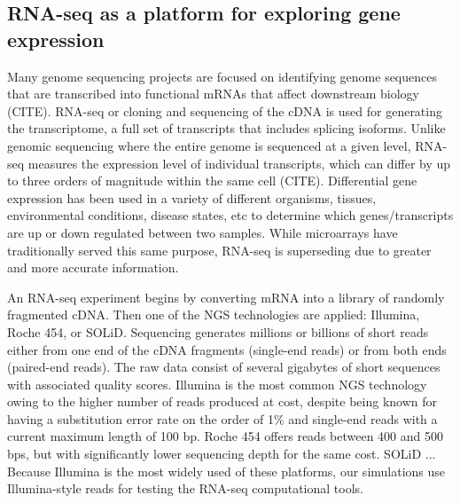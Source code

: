 \documentclass[10pt]{article}
\begin{document}


\subsection*{RNA-seq as a platform for exploring gene expression}

Many genome sequencing projects are focused on identifying genome sequences that are transcribed into functional mRNAs that affect downstream biology (CITE).  RNA-seq or cloning and sequencing of the cDNA is used for generating the transcriptome, a full set of transcripts that includes splicing isoforms.  Unlike genomic sequencing where the entire genome is sequenced at a given level, RNA-seq measures the expression level of individual transcripts, which can differ by up to three orders of magnitude within the same cell (CITE).  Differential gene expression has been used in a variety of different organisms, tissues, environmental conditions, disease states, etc to determine which genes/transcripts are up or down regulated between two samples.  While microarrays have traditionally served this same purpose, RNA-seq is superseding due to greater and more accurate information.

An RNA-seq experiment begins by converting mRNA into a library of randomly fragmented cDNA.  Then one of the NGS technologies are applied: Illumina, Roche 454, or SOLiD.  Sequencing generates millions or billions of short reads either from one end of the cDNA fragments (single-end reads) or from both ends (paired-end reads).  The raw data consist of several gigabytes of short sequences with associated quality scores.  Illumina is the most common NGS technology owing to the higher number of reads produced at cost, despite being known for having a substitution error rate on the order of 1\% and single-end reads with a current maximum length of 100 bp.  Roche 454 offers reads between 400 and 500 bps, but with significantly lower sequencing depth for the same cost.  SOLiD ...  Because Illumina is the most widely used of these platforms, our simulations use Illumina-style reads for testing the RNA-seq computational tools.
\end{document}
